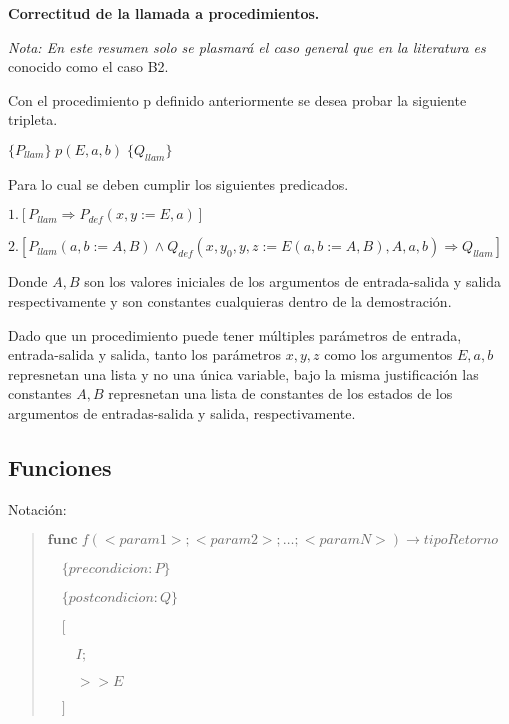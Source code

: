 \documentclass[hidelinks]{article}
\newenvironment{absolutelynopagebreak}
{\Needspace{10\baselineskip}\begin{quote}}
		{\end{quote}}
\begin{document}
\textbf{Correctitud de la llamada a procedimientos.}\par
\textit{Nota: En este resumen solo se plasmará el caso general que en la literatura es}
conocido como el caso B2.\par
Con el procedimiento p definido anteriormente se desea probar la siguiente
tripleta.\par
\begin{center}
	$\{P_{llam}\} \; p(E, a, b) \; \{Q_{llam}\}$
\end{center}\par
Para lo cual se deben cumplir los siguientes predicados.\par
$1.[P_{llam} \Rightarrow P_{def}(x,y := E, a)]$\par
$2.[P_{llam}(a,b := A,B) \land Q_{def}(x,y_0,y,z := E(a,b := A,B), A, a, b) \Rightarrow Q_{llam}]$\par

Donde $A,B$ son los valores iniciales de los argumentos de entrada-salida y
salida respectivamente y son constantes cualquieras dentro de la demostración.\par

Dado que un procedimiento puede tener múltiples parámetros de entrada,
entrada-salida y salida, tanto los parámetros $x,y,z$ como los argumentos
$E,a,b$ represnetan una lista y no una única variable, bajo la misma
justificación las constantes $A,B$ represnetan una lista de constantes de los
estados de los argumentos de entradas-salida y salida, respectivamente.\par

\subsection{Funciones}\par
Notación:\par
\begin{absolutelynopagebreak}
	$\textbf{func} \; f(<param1>; <param2>; \dots; <paramN>) \rightarrow tipoRetorno$ \par
	$\quad \{precondicion: P\}$ \par
	$\quad \{postcondicion: Q\}$\par
	$\quad [$\par
			$\qquad I;$\par
			$\qquad >> E$\par
			$\quad ]$\par
\end{absolutelynopagebreak}
\end{document}
